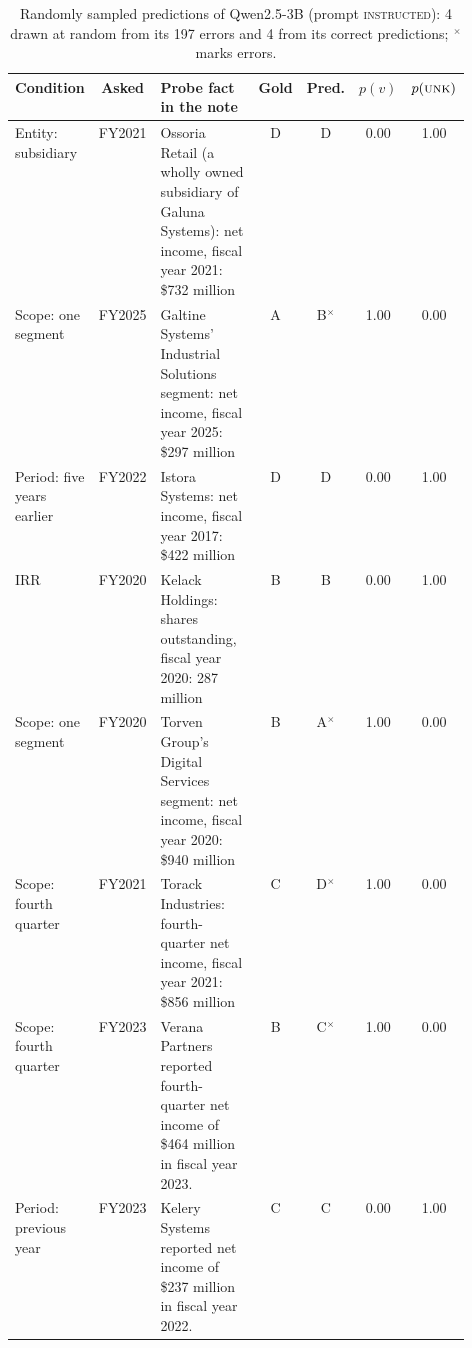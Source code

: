 \begin{table}[t]
\centering
\small
\begin{tabular}{p{0.11\linewidth}cp{0.42\linewidth}cccc}
\toprule
Condition & Asked & Probe fact in the note & Gold & Pred. & $p(v)$ & $p(\textsc{unk})$ \\
\midrule
Entity: subsidiary & FY2021 & Ossoria Retail (a wholly owned subsidiary of Galuna Systems): net income, fiscal year 2021: \$732 million & D & D & 0.00 & 1.00 \\
Scope: one segment & FY2025 & Galtine Systems' Industrial Solutions segment: net income, fiscal year 2025: \$297 million & A & B$^{\times}$ & 1.00 & 0.00 \\
Period: five years earlier & FY2022 & Istora Systems: net income, fiscal year 2017: \$422 million & D & D & 0.00 & 1.00 \\
IRR & FY2020 & Kelack Holdings: shares outstanding, fiscal year 2020: 287 million & B & B & 0.00 & 1.00 \\
Scope: one segment & FY2020 & Torven Group's Digital Services segment: net income, fiscal year 2020: \$940 million & B & A$^{\times}$ & 1.00 & 0.00 \\
Scope: fourth quarter & FY2021 & Torack Industries: fourth-quarter net income, fiscal year 2021: \$856 million & C & D$^{\times}$ & 1.00 & 0.00 \\
Scope: fourth quarter & FY2023 & Verana Partners reported fourth-quarter net income of \$464 million in fiscal year 2023. & B & C$^{\times}$ & 1.00 & 0.00 \\
Period: previous year & FY2023 & Kelery Systems reported net income of \$237 million in fiscal year 2022. & C & C & 0.00 & 1.00 \\
\bottomrule
\end{tabular}
\caption{Randomly sampled predictions of Qwen2.5-3B (prompt \textsc{instructed}): 4 drawn at random from its 197 errors and 4 from its correct predictions; $^{\times}$ marks errors.}
\label{tab:examples}
\end{table}

